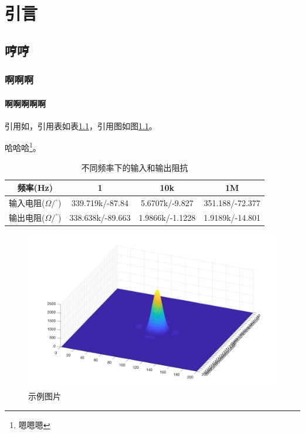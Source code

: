 \chapter{引言}

\section{哼哼}
\subsection{啊啊啊}
\subsubsection{啊啊啊啊啊}

引用如\cite{Wilt2010beamsearch}，引用表如表\ref{tab:input_output_r}，引用图如图\ref{fig:sample}。

哈哈哈\footnote{嗯嗯嗯}。

\begin{table}[h]
    \small
    \centering
    \caption{不同频率下的输入和输出阻抗}
    \label{tab:input_output_r}
    \begin{tabular}{cccc}
        \toprule %
        频率(Hz) & 1 & 10k & 1M \\
        \midrule
        输入电阻($\Omega/^\circ$) & 339.719k/-87.84 & 5.6707k/-9.827 & 351.188/-72.377\\
        输出电阻($\Omega/^\circ$) & 338.638k/-89.663 & 1.9866k/-1.1228 & 1.9189k/-14.801 \\
        \bottomrule
    \end{tabular}
\end{table}

\begin{figure}[h]
    \centering
    \includegraphics[width=12cm]{figures/Sample.jpg}
    \caption{示例图片}
    \label{fig:sample}
\end{figure}
